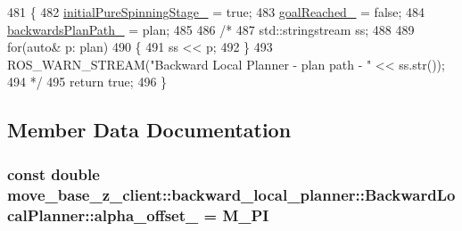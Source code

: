 \begin{DoxyCode}
481 \{
482     \hyperlink{classmove__base__z__client_1_1backward__local__planner_1_1BackwardLocalPlanner_a5db5b10d8cdf425321ee6ec932f594ae}{initialPureSpinningStage\_} = \textcolor{keyword}{true};
483     \hyperlink{classmove__base__z__client_1_1backward__local__planner_1_1BackwardLocalPlanner_a0a89141d3d3a8ebfb9e1d69d0d33fd49}{goalReached\_} = \textcolor{keyword}{false};
484     \hyperlink{classmove__base__z__client_1_1backward__local__planner_1_1BackwardLocalPlanner_a451add2af7d6d83a7415277311b3ed04}{backwardsPlanPath\_} = plan;
485 
486     \textcolor{comment}{/*}
487 \textcolor{comment}{    std::stringstream ss;}
488 \textcolor{comment}{}
489 \textcolor{comment}{    for(auto& p: plan)}
490 \textcolor{comment}{    \{}
491 \textcolor{comment}{        ss << p;}
492 \textcolor{comment}{    \}}
493 \textcolor{comment}{    ROS\_WARN\_STREAM("Backward Local Planner - plan path - " << ss.str());}
494 \textcolor{comment}{    */}
495     \textcolor{keywordflow}{return} \textcolor{keyword}{true};
496 \}
\end{DoxyCode}


\subsection{Member Data Documentation}
\subsubsection[{\texorpdfstring{alpha\+\_\+offset\+\_\+}{alpha_offset_}}]{\setlength{\rightskip}{0pt plus 5cm}const double move\+\_\+base\+\_\+z\+\_\+client\+::backward\+\_\+local\+\_\+planner\+::\+Backward\+Local\+Planner\+::alpha\+\_\+offset\+\_\+ = M\+\_\+\+PI\hspace{0.3cm}{\ttfamily [private]}}\hypertarget{classmove__base__z__client_1_1backward__local__planner_1_1BackwardLocalPlanner_ad406c50cdc7a7603c023718543fc2f5c}{}\label{classmove__base__z__client_1_1backward__local__planner_1_1BackwardLocalPlanner_ad406c50cdc7a7603c023718543fc2f5c}


